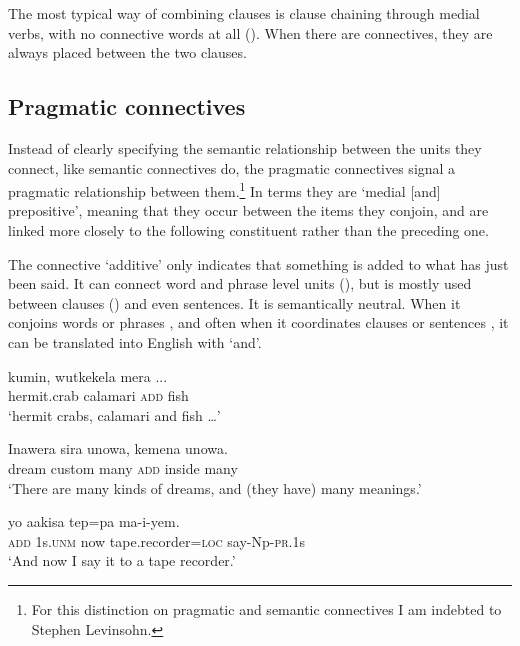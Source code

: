 The most typical way of combining clauses is clause chaining through medial verbs, with no connective words at all (). When there are connectives, they are always placed between the two clauses. 

\subsection{Pragmatic connectives}\label{sec:3:y:x}
{}
Instead of clearly specifying the semantic relationship between the units they connect, like semantic connectives do, the pragmatic connectives signal a pragmatic relationship between them.\footnote{For this distinction on pragmatic and semantic connectives I am indebted to Stephen Levinsohn.} In  terms they are `medial [and] prepositive', meaning that they occur between the items they conjoin, and are linked more closely to the following constituent rather than the preceding one.

The connective  `additive' only indicates that something is added to what has just been said. It can connect word and phrase level units (), but is mostly used between clauses () and even sentences. It is semantically neutral. When it conjoins words  or phrases , and often when it coordinates clauses  or sentences , it can be translated into English with `and'. 

\ea%
\label{ex:3:x711}
\gll kumin, wutkekela  mera ... \\
hermit.crab calamari \textsc{add} fish\\
\glt`hermit crabs, calamari and fish {\dots}'
\z

\ea%
\label{ex:3:x713}
\gll Inawera sira unowa,  kemena unowa. \\
dream custom many \textsc{add} inside many\\
\glt`There are many kinds of dreams, and (they have) many meanings.'
\z

\ea%
\label{ex:3:x714}
\gll {} yo aakisa tep=pa ma-i-yem. \\
\textsc{add} 1s.\textsc{unm} now tape.recorder=\textsc{loc} say-Np-\textsc{pr}.1s\\
\glt`And now I say it to a tape recorder.'
\z


